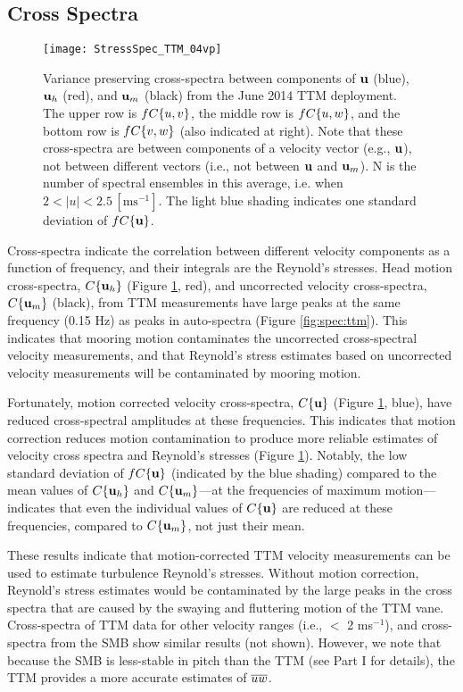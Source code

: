 \subsection{Cross Spectra}

\begin{figure}[t]
  \centering
  \texttt{[image: StressSpec\_TTM\_04vp]}
  \caption{Variance preserving cross-spectra between components of $\mathbf{u}$ (blue), $\mathbf{u}_{h}$ (red), and $\mathbf{u}_{m}$ (black) from the June 2014 TTM deployment. The upper row is $f C\{u,v\}$, the middle row is $f C\{u,w\}$, and the bottom row is $f C\{v,w\}$ (also indicated at right).  Note that these cross-spectra are between components of a velocity vector (e.g., $\mathbf{u}$), not between different vectors (i.e., not between $\mathbf{u}$ and $\mathbf{u}_{m}$). N is the number of spectral ensembles in this average, i.e. when $2 < |u| < 2.5\,\mathrm{[ms^{-1}]}$. The light blue shading indicates one standard deviation of $f C\{\mathbf{u}\}$.}
  \label{fig:cspec:ttm}
\end{figure}

Cross-spectra indicate the correlation between different velocity components as a function of frequency, and their integrals are the Reynold's stresses. Head motion cross-spectra, $C\{\mathbf{u}_{h}\}$ (Figure \ref{fig:cspec:ttm}, red), and uncorrected velocity cross-spectra, $C\lbrace \mathbf{u}_{m} \rbrace$ (black), from TTM measurements have large peaks at the same frequency (0.15 Hz) as peaks in auto-spectra (Figure \ref{fig:spec:ttm}).  This indicates that mooring motion contaminates the uncorrected cross-spectral velocity measurements, and that Reynold's stress estimates based on uncorrected velocity measurements will be contaminated by mooring motion. 

Fortunately, motion corrected velocity cross-spectra, $C\{\mathbf{u}\}$ (Figure \ref{fig:cspec:ttm}, blue), have reduced cross-spectral amplitudes at these frequencies. This indicates that motion correction reduces motion contamination to produce more reliable estimates of velocity cross spectra and Reynold's stresses (Figure \ref{fig:cspec:ttm}). Notably, the low standard deviation of $f C\{\mathbf{u}\}$ (indicated by the blue shading) compared to the mean values of $C\{\mathbf{u}_{h}\}$ and $C\{\mathbf{u}_{m}\}$---at the frequencies of maximum motion---indicates that even the individual values of $C\{\mathbf{u}\}$ are reduced at these frequencies, compared to $C\{\mathbf{u}_{m}\}$, not just their mean.

These results indicate that motion-corrected TTM velocity measurements can be used to estimate turbulence Reynold's stresses. Without motion correction, Reynold's stress estimates would be contaminated by the large peaks in the cross spectra that are caused by the swaying and fluttering motion of the TTM vane. Cross-spectra of TTM data for other velocity ranges (i.e., $<$ 2 ms$^{-1}$), and cross-spectra from the SMB show similar results (not shown). However, we note that because the SMB is less-stable in pitch than the TTM (see Part I for details), the TTM provides a more accurate estimates of  $\overline{uw}$.

